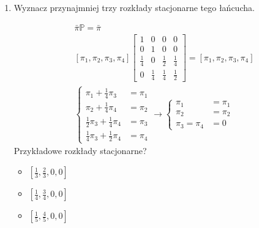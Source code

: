\documentclass[a4paper,12pt]{article}
\theoremstyle{definition}%
\theoremstyle{definition}
\theoremstyle{problem}
\begin{document}
\begin{enumerate}[label=\alph*)]
\item Wyznacz przynajmniej trzy rozkłady stacjonarne tego łańcucha.

\begin{align*}
&\bar{\pi}\mathbb{P}=\bar{\pi}\\
&\left[\pi _1, \pi _2,\pi _3,\pi _4\right]\begin{bmatrix}
1&0&0&0\\
0&1&0&0\\
\frac{1}{4}&0&\frac{1}{2}&\frac{1}{4}\\
0&\frac{1}{4}&\frac{1}{4}&\frac{1}{2}
\end{bmatrix}=\left[\pi _1, \pi _2,\pi _3,\pi _4\right]\\
&\left\{\begin{matrix}
\pi _1 +\frac{1}{4}\pi _3 &= \pi _1\\
\pi _2 + \frac{1}{4}\pi _4 &= \pi _2\\
\frac{1}{2}\pi _3+\frac{1}{4}\pi _4 &= \pi _3\\
\frac{1}{4}\pi _3+\frac{1}{2}\pi _4 &= \pi _4
\end{matrix}\right.\rightarrow \left\{\begin{matrix}
\pi _1 &= \pi _1\\
\pi _2 &= \pi _2\\
\pi _3 = \pi _4 &= 0
\end{matrix}\right.
\end{align*}
Przykładowe rozkłady stacjonarne?
\begin{itemize}
\item $ \left[\frac{1}{3}, \frac{2}{3},0,0\right]$
\item $ \left[\frac{1}{4}, \frac{3}{4},0,0\right]$
\item $ \left[\frac{1}{5}, \frac{4}{5},0,0\right]$
\end{itemize}


\end{enumerate}
\end{document}

